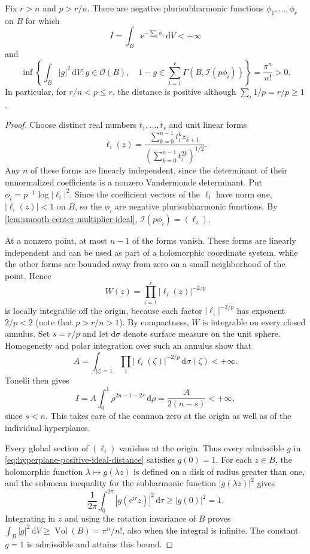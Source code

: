 \begin{example}\label{ex:hyperplane-positive-ideal-distance}
Fix $r>n$ and $p>r/n$. There are negative plurisubharmonic functions $\phi_1,\ldots,\phi_r$ on $B$ for which
\[
 I=\int_B\mathrm e^{-\sum_i\phi_i}\,\mathrm{d}V<+\infty
\]
and
\begin{equation}\label{eq:hyperplane-positive-ideal-distance}
 \inf\left\{\int_B|g|^2\,\mathrm{d}V:g\in\mathcal O(B),\quad
       1-g\in\sum_{i=1}^r\Gamma(B,\mathcal I(p\phi_i))\right\}
       =\frac{\pi^n}{n!}>0.
\end{equation}
In particular, for $r/n<p\leq r$, the distance is positive although $\sum_i1/p=r/p\geq1$.
\end{example}
\begin{proof}
Choose distinct real numbers $t_1,\ldots,t_r$ and unit linear forms
\[
 \ell_i(z)=\frac{\sum_{k=0}^{n-1}t_i^kz_{k+1}}
                    {(\sum_{k=0}^{n-1}t_i^{2k})^{1/2}}.
\]
Any $n$ of these forms are linearly independent, since the determinant of their unnormalized coefficients is a nonzero Vandermonde determinant. Put $\phi_i=p^{-1}\log|\ell_i|^2$. Since the coefficient vectors of the $\ell_i$ have norm one, $|\ell_i(z)|<1$ on $B$, so the $\phi_i$ are negative plurisubharmonic functions. By \cref{lem:smooth-center-multiplier-ideal}, $\mathcal I(p\phi_i)=(\ell_i)$.

At a nonzero point, at most $n-1$ of the forms vanish. These forms are linearly independent and can be used as part of a holomorphic coordinate system, while the other forms are bounded away from zero on a small neighborhood of the point. Hence
\[
 W(z)=\prod_{i=1}^r|\ell_i(z)|^{-2/p}
\]
is locally integrable off the origin, because each factor $|\ell_i|^{-2/p}$ has exponent $2/p<2$ (note that $p>r/n>1$). By compactness, $W$ is integrable on every closed annulus. Set $s=r/p$ and let $\mathrm{d}\sigma$ denote surface measure on the unit sphere. Homogeneity and polar integration over such an annulus show that
\[
 A=\int_{|\zeta|=1}\prod_i|\ell_i(\zeta)|^{-2/p}\,
                                     \mathrm{d}\sigma(\zeta)<+\infty.
\]
Tonelli then gives
\[
 I=A\int_0^1\rho^{2n-1-2s}\,\mathrm{d}\rho
       =\frac{A}{2(n-s)}<+\infty,
\]
since $s<n$. This takes care of the common zero at the origin as well as of the individual hyperplanes.

Every global section of $(\ell_i)$ vanishes at the origin. Thus every admissible $g$ in \eqref{eq:hyperplane-positive-ideal-distance} satisfies $g(0)=1$. For each $z\in B$, the holomorphic function $\lambda\mapsto g(\lambda z)$ is defined on a disk of radius greater than one, and the submean inequality for the subharmonic function $|g(\lambda z)|^2$ gives
\[
 \frac1{2\pi}\int_0^{2\pi}|g(\mathrm e^{\mathrm i\tau}z)|^2\,
                         \mathrm{d}\tau\geq|g(0)|^2=1.
\]
Integrating in $z$ and using the rotation invariance of $B$ proves $\int_B|g|^2\,\mathrm{d}V\geq\operatorname{Vol}(B)=\pi^n/n!$, also when the integral is infinite. The constant $g=1$ is admissible and attains this bound.
\end{proof}

